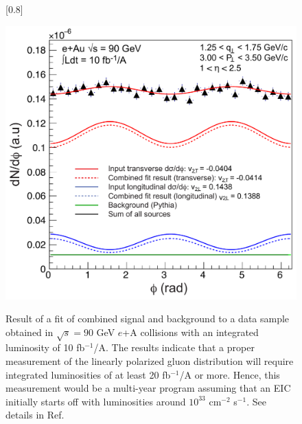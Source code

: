 \begin{figure}[b]

[0.8\linewidth]
{
\caption{Result of a fit of combined signal and background to a data sample obtained
	in $\sqrt{s}=90$ GeV $e$+A collisions with an integrated luminosity of 10 fb$^{-1}$/A.
	The results indicate that a proper measurement of
the linearly polarized gluon distribution will require integrated
luminosities of at least 20 fb$^{-1}$/A or more. Hence, this
measurement would be a multi-year program assuming that an EIC
initially starts off with luminosities around $10^{33}$ cm$^{-2}$
s$^{-1}$. See details in Ref.~\cite{Dumitru:2018kuw}
	}
	\label{fig:extract}
}
{ \includegraphics[width=\linewidth]{./figures/extract.pdf}
 }
\end{figure} 


